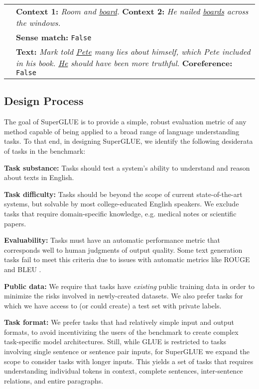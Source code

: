\begin{table*}[t]
\begin{tabular}{p{}p{}}
\midrule
\parbox[t]{1mm}{} &
\textbf{Context 1:} \textit{Room and \underline{board}.} \quad
\textbf{Context 2:} \textit{He nailed \underline{boards} across the windows.} \\
& \textbf{Sense match:} \texttt{False}\\

\midrule
\parbox[t]{1mm}{} & 
\textbf{Text:} \textit{Mark told \underline{Pete} many lies about himself, which Pete included in his book. \underline{He} should have been more truthful.} \quad \textbf{Coreference:} \texttt{False}\vspace{0.25em}\\
\bottomrule
\end{tabular}

\end{table*}

\subsection{Design Process}

The goal of SuperGLUE is to provide a simple, robust evaluation metric of any method capable of being applied to a broad range of language understanding tasks. To that end, in designing SuperGLUE, we identify the following desiderata of tasks in the benchmark:

\textbf{Task substance:} Tasks should test a system's ability to understand and reason about texts in English. 

\textbf{Task difficulty:} Tasks should be beyond the scope of current state-of-the-art systems, but solvable by most college-educated English speakers. We exclude tasks that require domain-specific knowledge, e.g. medical notes or scientific papers.

\textbf{Evaluability:} Tasks must have an automatic performance metric that corresponds well to human judgments of output quality. Some text generation tasks fail to meet this criteria due to issues with automatic metrics like ROUGE and BLEU \citep[][i.a.]{callison2006re,liu2016not}.

\textbf{Public data:} We require that tasks have \textit{existing} public training data in order to minimize the risks involved in newly-created datasets. We also prefer tasks for which we have access to (or could create) a test set with private labels.

\textbf{Task format:} We prefer tasks that had relatively simple input and output formats, to avoid incentivizing the users of the benchmark to create complex task-specific model architectures. Still, while GLUE is restricted to tasks involving single sentence or sentence pair inputs, for SuperGLUE we expand the scope to consider tasks with longer inputs. This yields a set of tasks that requires understanding individual tokens in context, complete sentences, inter-sentence relations, and entire paragraphs.


